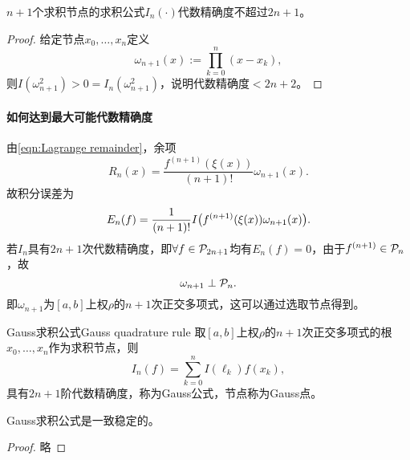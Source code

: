 \begin{theorem}
    {}{}
    $n+1$个求积节点的求积公式$I_n(\cdot)$代数精确度不超过$2n+1$。
\end{theorem}

\begin{proof}
    给定节点$x_0,\ldots,x_n$定义
    \[
        \omega_{n+1}(x):=\prod_{k=0}^n(x-x_k),
    \]
    则$I(\omega_{n+1}^2)>0=I_n(\omega_{n+1}^2)$，说明代数精确度$<2n+2$。
\end{proof}

\paragraph{如何达到最大可能代数精确度}

由\eqref{eqn:Lagrange remainder}，余项
\[
    R_n(x)=\frac{f^{(n+1)}(\xi(x))}{(n+1)!}\omega_{n+1}(x).
\]
故积分误差为
\[
    E_n(f)=\frac1{(n+1)!}I\bigl(f^{(n+1)}(\xi(x))\omega_{n+1}(x)\bigr).
\]
若$I_n$具有$2n+1$次代数精确度，即$\forall f\in\mathcal P_{2n+1}$均有$E_n(f)=0$，由于$f^{(n+1)}\in\mathcal P_n$，故
\begin{equation}
    \omega_{n+1}\perp\mathcal P_n.
\end{equation}
即$\omega_{n+1}$为$[a,b]$上权$\rho$的$n+1$次正交多项式，这可以通过选取节点得到。

\begin{theorem}
    {Gauss求积公式}{Gauss quadrature rule}
    取$[a,b]$上权$\rho$的$n+1$次正交多项式的根$x_0,\ldots,x_n$作为求积节点，则
    \[
        I_n(f)=\sum_{k=0}^nI(\ell_k)f(x_k),
    \]
    具有$2n+1$阶代数精确度，称为Gauss公式，节点称为Gauss点。
\end{theorem}

\begin{theorem}
    {}{}
    Gauss求积公式是一致稳定的。
\end{theorem}

\begin{proof}
    略
\end{proof}
